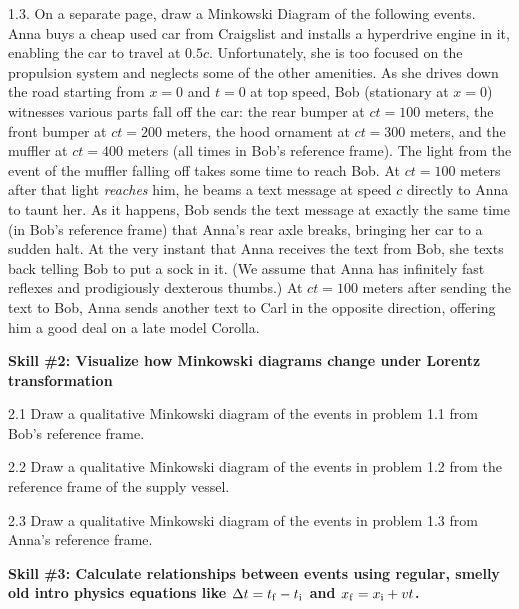 1.3. On a separate page, draw a Minkowski Diagram of the following events.  Anna buys a cheap used car from Craigslist and installs a hyperdrive engine in it, enabling the car to travel at $0.5 c$.  Unfortunately, she is too focused on the propulsion system and neglects some of the other amenities.  
As she drives down the road starting from $x=0$ and $t=0$ at top speed, Bob (stationary at $x=0$) witnesses various parts fall off the car: 
the rear bumper at $ct=100$ meters, the front bumper at $ct=200$ meters, the hood ornament at $ct=300$ meters, and the muffler at $ct=400$ meters (all times in Bob's reference frame).  
The light from the event of the muffler falling off takes some time to reach Bob.  
At $ct=100$ meters after that light \textit{reaches} him, he beams a text message at speed $c$ directly to Anna to taunt her.  As it happens, Bob sends the text message at exactly the same time (in Bob's reference frame) that Anna's rear axle breaks, bringing her car to a sudden halt.  At the very instant that Anna receives the text from Bob, she texts back telling Bob to put a sock in it.  (We assume that Anna has infinitely fast reflexes and prodigiously dexterous thumbs.)  
At $ct=100$ meters after sending the text to Bob, Anna sends another text to Carl in the opposite direction, offering him a good deal on a late model Corolla.  
\bigskip



\textbf{Skill \#2: Visualize how Minkowski diagrams change under Lorentz transformation}

2.1 Draw a qualitative Minkowski diagram of the events in problem 1.1 from Bob's reference frame.  
\bigskip

2.2 Draw a qualitative Minkowski diagram of the events in problem 1.2 from the reference frame of the supply vessel.  
\bigskip

2.3 Draw a qualitative Minkowski diagram of the events in problem 1.3 from Anna's reference frame.  
\bigskip

\pagebreak



\textbf{Skill \#3: Calculate relationships between events using regular, smelly old intro physics equations like \boldmath$ \Delta t=t_{\rm f}-t_{\rm i}$ and \boldmath${x_{\rm f}=x_{\rm i}+vt}$.}

